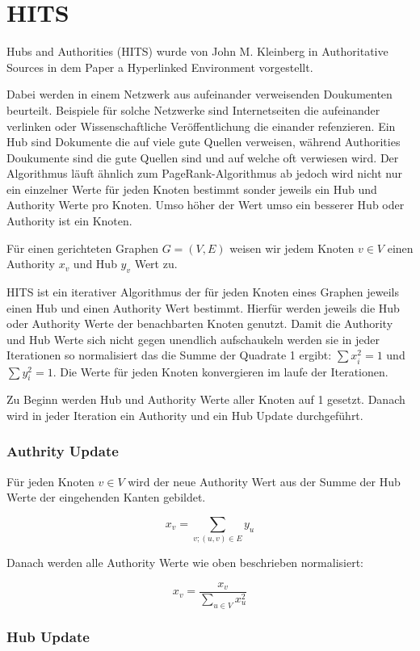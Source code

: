 \section{HITS}

Hubs and Authorities (HITS) wurde von John M. Kleinberg in Authoritative Sources in dem Paper a Hyperlinked Environment vorgestellt.

Dabei werden in einem Netzwerk aus aufeinander verweisenden Doukumenten beurteilt. Beispiele für solche Netzwerke sind Internetseiten die aufeinander
verlinken oder Wissenschaftliche Veröffentlichung die einander refenzieren. Ein Hub sind Dokumente die auf viele gute Quellen verweisen, während
Authorities Doukumente sind die gute Quellen sind und auf welche oft verwiesen wird. Der Algorithmus läuft ähnlich zum PageRank-Algorithmus ab 
jedoch wird nicht nur ein einzelner Werte für jeden Knoten bestimmt sonder jeweils ein Hub und Authority Werte pro Knoten. Umso höher der Wert umso
ein besserer Hub oder Authority ist ein Knoten.

Für einen gerichteten Graphen $G = (V, E)$ weisen wir jedem Knoten $v \in V$ einen Authority $x_{v}$ und Hub $y_{v}$ Wert zu.

HITS ist ein iterativer Algorithmus der für jeden Knoten eines Graphen jeweils einen Hub und einen Authority Wert bestimmt. Hierfür 
werden jeweils die Hub oder Authority Werte der benachbarten Knoten genutzt. Damit die Authority und Hub Werte sich nicht gegen
unendlich aufschaukeln werden sie in jeder Iterationen so normalisiert das die Summe der Quadrate 1 ergibt:
$ \sum x_{i}^{2} = 1 $ und $ \sum y_{i}^{2} = 1$.
Die Werte für jeden Knoten konvergieren im laufe der Iterationen.

Zu Beginn werden Hub und Authority Werte aller Knoten auf 1 gesetzt. Danach wird in jeder Iteration ein Authority und ein Hub Update durchgeführt.
\subsubsection{Authrity Update}

Für jeden Knoten $ v \in V $ wird der neue Authority Wert aus der Summe der Hub Werte der eingehenden Kanten gebildet.

\[ x_{v} = \sum_{v; (u, v) \in E} y_{u} \]

Danach werden alle Authority Werte wie oben beschrieben normalisiert:

\[ x_{v} =  \frac{x_{v}}{\sum_{u \in V} x_{u}^{2}} \]

\subsubsection{Hub Update}

